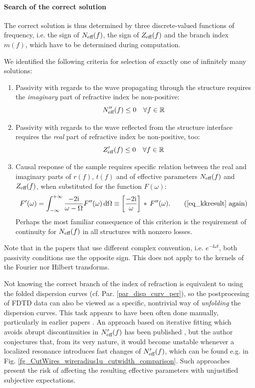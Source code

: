\paragraph{Search of the correct solution} %
The correct solution is thus determined by three discrete-valued functions of frequency, i.e. the sign of $N_{\text{eff} }(f)$, the sign of $Z_{\text{eff} }(f)$ and the branch index $m(f)$, which have to be determined during computation. 

We identified the following criteria for selection of exactly one of infinitely many solutions:
\begin{enumerate}
	\item{Passivity with regards to the wave propagating through the structure requires the \textit{imaginary} part of refractive index be non-positive: 
		 \begin{equation} N_{\text{eff} }''(f) \leq 0 \quad \forall f\in \mathbb{R} \label{eq_Neff_pass}\end{equation}
		 } 
	 \item{Passivity with regards to the wave reflected from the structure interface requires the \textit{real} part of refractive index be non-positive, too: 
		 \begin{equation} Z_{\text{eff} }'(f) \leq 0 \quad \forall f\in \mathbb{R} \label{eq_Zeff_pass}\end{equation}
		 } 
	 \item{Causal response of the sample requires specific relation between the real and imaginary parts of $r(f)$, $t(f)$ and of effective parameters $N_{\text{eff} }(f)$ and $Z_{\text{eff} }(f)$, when substituted for the function $F(\omega)$:
		 \begin{equation} 
F'(\omega) = \int_{-\infty}^{+\infty}  \frac{-2\ii}{\omega - \Omega} F''(\omega) \,\mbox{d}\Omega  \equiv  \left[\frac{-2\ii}{\omega}\right]\,\ast\,F''(\omega). \tag{\ref{eq_kkresult} \again}\end{equation} 
Perhaps the most familiar consequence of this criterion is the requirement of continuity for $N_{\text{eff} }(f)$ in all structures with nonzero losses.
		 } 
\end{enumerate}
Note that in the papers that use different complex convention, i.e. $e^{-\ii\omega t}$, both passivity conditions use the opposite sign. This does not apply to the kernels of the Fourier nor Hilbert transforms.

Not knowing the correct branch of the index of refraction is equivalent to using the folded dispersion curves (cf. Par. \ref{par_disp_curv_per}), %
so the postprocesing of FDTD data can also be viewed as a specific, nontrivial way of \textit{unfolding} the dispersion curves. This task appears to have been often done manually, particularly in earlier papers \cite{smith2002determination}. An approach based on iterative fitting which avoids abrupt discontinuities in $N_{\text{eff} }'(f)$ has been published \cite{chen2004robust}, but the author conjectures that, from its very nature, it would become unstable whenever a localized resonance introduces fast changes of $N_{\text{eff} }'(f)$, which can be found e.g. in Fig. \ref{fg_CutWires_wireradius1u_cutwidth_comparison}. Such approaches present the risk of affecting the resulting effective parameters with unjustified subjective expectations.


